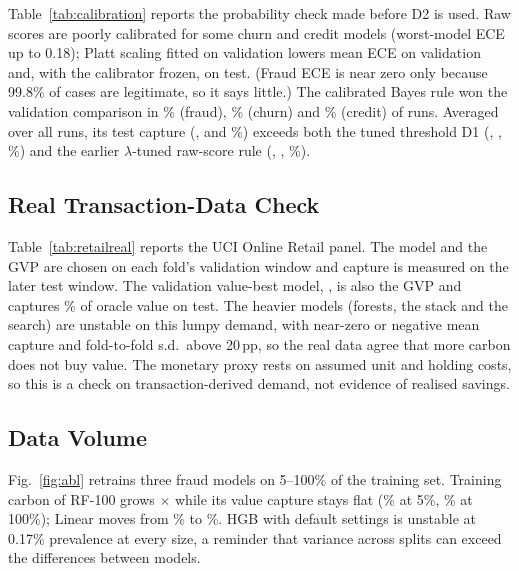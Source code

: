 \documentclass[conference]{IEEEtran}
\begin{document}


Table~\ref{tab:calibration} reports the probability check made before D2 is used. Raw scores are poorly calibrated for
some churn and credit models (worst-model ECE up to 0.18); Platt scaling fitted on validation lowers mean ECE on
validation and, with the calibrator frozen, on test. (Fraud ECE is near zero only because 99.8\% of cases are
legitimate, so it says little.) The calibrated Bayes rule won the validation comparison in \FraudDTwoPct\% (fraud),
\ChurnDTwoPct\% (churn) and \CreditDTwoPct\% (credit) of runs. Averaged over all runs, its test capture
(\FraudCapDTwo, \ChurnCapDTwo{} and \CreditCapDTwo\%) exceeds both the tuned threshold D1 (\FraudCapDOne, \ChurnCapDOne,
\CreditCapDOne\%) and the earlier $\lambda$-tuned raw-score rule (\FraudCapDTwoRaw, \ChurnCapDTwoRaw, \CreditCapDTwoRaw\%).



\subsection{Real Transaction-Data Check}
Table~\ref{tab:retailreal} reports the UCI Online Retail panel. The model and the GVP are chosen on each fold's
validation window and capture is measured on the later test window. The validation value-best model, \RRValueBest, is
also the GVP and captures \RRBestTest\% of oracle value on test. The heavier models (forests, the stack and the search)
are unstable on this lumpy demand, with near-zero or negative mean capture and fold-to-fold s.d.\ above 20\,pp, so the real data
agree that more carbon does not buy value. The monetary proxy rests on assumed unit and holding costs, so this is a
check on transaction-derived demand, not evidence of realised savings.



\subsection{Data Volume}
Fig.~\ref{fig:abl} retrains three fraud models on 5--100\% of the training set. Training carbon of RF-100 grows
\AblRfRatio$\times$ while its value capture stays flat (\AblRfFive\% at 5\%, \AblRfFull\% at 100\%); Linear moves from
\AblLinFive\% to \AblLinFull\%. HGB with default settings is unstable at 0.17\% prevalence at every size, a reminder that
variance across splits can exceed the differences between models.
\end{document}
